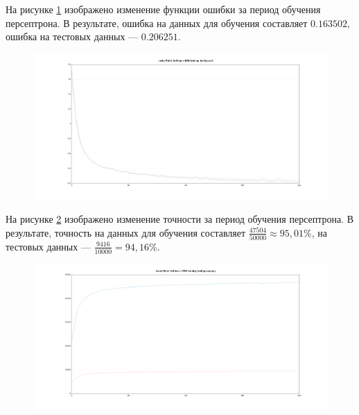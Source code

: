 \documentclass[a4paper, 14pt]{extarticle}
\begin{document}

На рисунке \ref{fig:3_20_leaky_relu_softmax_mse_cost} изображено изменение функции ошибки за период обучения персептрона.
В результате, ошибка на данных для обучения составляет $0.163502$, ошибка на тестовых данных --- $0.206251$.

\begin{figure}[!htb]
  \centering\includegraphics[width=\textwidth]{images/3_20_leaky_relu_softmax_mse_cost.png}
  \caption{}
  \label{fig:3_20_leaky_relu_softmax_mse_cost}
\end{figure}

На рисунке \ref{fig:3_20_leaky_relu_softmax_mse_accuracy} изображено изменение точности за период обучения персептрона.
В результате, точность на данных для обучения составляет $\frac{47504}{50000} \approx 95,01\%$, на тестовых данных --- $\frac{9416}{10000} = 94,16\%$.

\begin{figure}[!htb]
  \centering\includegraphics[width=\textwidth]{images/3_20_leaky_relu_softmax_mse_accuracy.png}
  \caption{}
  \label{fig:3_20_leaky_relu_softmax_mse_accuracy}
\end{figure}
\end{document}
